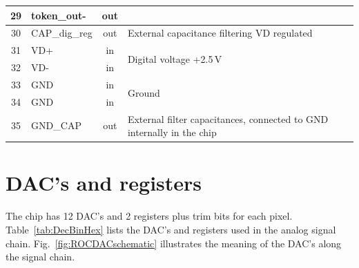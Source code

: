 \begin{table}[h]
\begin{center}
{\begin{tabular}{clcl}
	29 & token\_out-     & out & \\
	\midrule %
	30 & CAP\_dig\_reg   & out & External capacitance filtering VD regulated \\
	\midrule %
	31 & VD+             & in  & \multirow{2}{*}{Digital voltage +2.5\,V} \\
	32 & VD-             & in  & \\
	\midrule %
	33 & GND             & in  & \multirow{2}{*}{Ground}\\
	34 & GND             & in  & \\
	\midrule %
	35 & GND\_CAP        & out & External filter capacitances, connected to GND internally in the chip \\
	\bottomrule %
	\end{tabular}
	}
    \end{center}
\end{table}

\chapter{DAC's and registers}

The chip has 12 DAC's and 2 registers plus trim bits for each pixel. Table~\ref{tab:DecBinHex} lists the DAC's and registers used in the analog signal chain. Fig.~\ref{fig:ROCDACschematic} illustrates the meaning of the DAC's along the signal chain.


